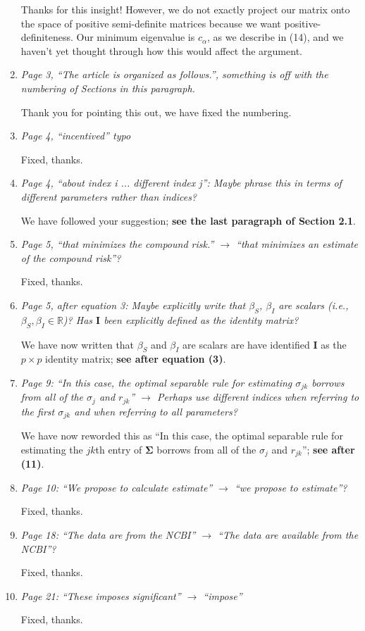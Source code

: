 \documentclass[12pt]{article}
\def\bs{\boldsymbol}
\begin{document}
\begin{enumerate}
  Thanks for this insight! However, we do not exactly project our matrix onto the space of positive semi-definite matrices because we want positive-definiteness. Our minimum eigenvalue is $c_\alpha$, as we describe in (14), and we haven't yet thought through how this would affect the argument.

\item \emph{Page 3, ``The article is organized as follows.'', something is off with the numbering of Sections in this paragraph. }

  Thank you for pointing this out, we have fixed the numbering.

\item \emph{Page 4, ``incentived'' typo }

  Fixed, thanks.

\item \emph{Page 4, ``about index i ... different index j'': Maybe phrase this in terms of different parameters rather than indices?}

  We have followed your suggestion; \textbf{see the last paragraph of Section 2.1}.

\item \emph{Page 5, ``that minimizes the compound risk.” $\rightarrow$ “that minimizes an estimate of the compound risk''?}

  Fixed, thanks.

\item \emph{Page 5, after equation 3: Maybe explicitly write that $\beta_S$, $\beta_I$ are scalars (i.e., $\beta_S, \beta_I \in \mathbb{R}$)? Has $\bs{I}$ been explicitly defined as the identity matrix? }

  We have now written that $\beta_S$ and $\beta_I$ are scalars are have identified $\bs{I}$ as the $p \times p$ identity matrix; \textbf{see after equation (3)}.

\item \emph{Page 9: ``In this case, the optimal separable rule for estimating $\sigma_{jk}$ borrows from all of the $\sigma_j$ and $r_{jk}$'' $\rightarrow$ Perhaps use different indices when referring to the first $\sigma_{jk}$ and when referring to all parameters? }

  We have now reworded this as ``In this case, the optimal separable rule for estimating the $jk$th entry of $\bs{\Sigma}$ borrows from all of the $\sigma_j$ and $r_{jk}$''; \textbf{see after (11)}.

\item \emph{Page 10: ``We propose to calculate estimate'' $\rightarrow$ ``we propose to estimate''?}

  Fixed, thanks.

\item \emph{Page 18: ``The data are from the NCBI'' $\rightarrow$ ``The data are available from the NCBI''?}

  Fixed, thanks.

\item \emph{Page 21: ``These imposes significant'' $\rightarrow$ ``impose'' }

  Fixed, thanks.
  
\end{enumerate}



\end{document}
